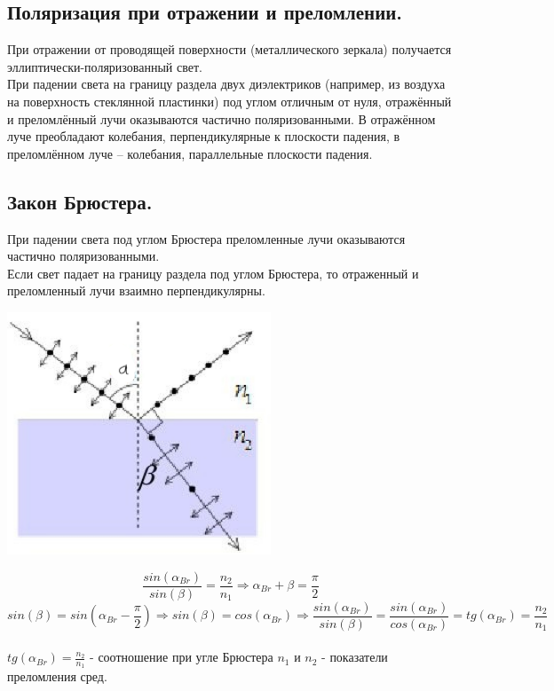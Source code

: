 \documentclass[12pt]{report}
\begin{document}
\subsection{  Поляризация при отражении и преломлении.}
При отражении от проводящей поверхности (металлического зеркала) получается эллиптически-поляризованный свет.\\
При падении света на границу раздела двух диэлектриков (например, из воздуха на поверхность стеклянной пластинки) под углом отличным от нуля, отражённый и преломлённый лучи оказываются частично поляризованными. В отражённом луче преобладают колебания, перпендикулярные к плоскости падения, в преломлённом луче – колебания, параллельные плоскости падения.
\subsection{  Закон Брюстера.}
При падении света под углом Брюстера преломленные лучи оказываются частично поляризованными.\\

Если свет падает на границу раздела под углом Брюстера, то отраженный и преломленный лучи взаимно перпендикулярны.

\begin{center}
    \includegraphics[scale=0.7]{graphics/30_1.png}
\end{center}

\[ \frac{sin(\alpha_{Br})}{sin(\beta)} = \frac{n_2}{n_1} \Rightarrow{}  \alpha_{Br}+\beta = \frac{\pi}{2} \]  \[ sin(\beta) = sin(\alpha_{Br} - \frac{\pi}{2}) \Rightarrow{} sin(\beta) = cos(\alpha_{Br}) \Rightarrow{} \frac{sin(\alpha_{Br})}{sin(\beta)} =
    \frac{sin(\alpha_{Br})}{cos(\alpha_{Br})} = tg(\alpha_{Br})=\frac{n_2}{n_1}\]\\
$tg(\alpha_{Br})=\frac{n_2}{n_1}$ - соотношение при угле Брюстера
$n_1$ и $n_2$ - показатели преломления сред.
\end{document}
